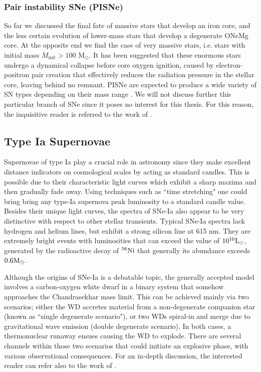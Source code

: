 \documentclass[../../main/thesis_msc.tex]{subfiles}
\begin{document}
				\subsubsection{Pair instability SNe (PISNe)}
				
					So far we discussed the final fate of massive stars that develop an iron core, and the less certain evolution of lower-mass stars that develop a degenerate ONeMg core. At the opposite end we find the case of very massive stars, i.e. stars with initial mass $M_{\text{init}} > 100$ M$_{\odot}$. It has been suggested \citep{langer12} that these enormous stars undergo a dynamical collapse before core oxygen ignition, caused by electron-positron pair creation that effectively reduces the radiation pressure in the stellar core, leaving behind no remnant. PISNe are expected to produce a wide variety of SN types depending on their mass range \citep{Gilmer2017}. We will not discuss further this particular branch of SNe since it poses no interest for this thesis. For this reason, the inquisitive reader is referred to the work of \cite{Langer_PISNe, Woosley_PISNe, Kozyreva2017, Gilmer2017}.
					
			
			\subsection{Type Ia Supernovae}
				
				Supernovae of type Ia play a crucial role in astronomy since they make excellent distance indicators on cosmological scales by acting as standard candles. This is possible due to their characteristic light curves which exhibit a sharp maxima and then gradually fade away. Using techniques such as ``time stretching" \citep{Perlmutter2003} one could bring bring any type-Ia supernova peak luminosity to a standard candle value. Besides their unique light curves, the spectra of SNe-Ia also appear to be very distinctive with respect to other stellar transients. Typical SNe-Ia spectra lack hydrogen and helium lines, but exhibit a strong silicon line at 615 nm. They are extremely bright events with luminosities that can exceed the value of $\rm 10^{10} L_{\odot}$, generated by the radioactive decay of $\rm ^{56}Ni$ that generally its abundance exceeds $\rm 0.6 M_{\odot}$.
				
				Although the origins of SNe-Ia is a debatable topic, the generally accepted model involves a carbon-oxygen white dwarf in a binary system that somehow approaches the Chandrasekhar mass limit. This can be achieved mainly via two scenarios; either the WD accretes material from a non-degenerate companion star (known as ``single degenerate scenario"), or two WDs spiral-in and merge due to gravitational wave emission (double degenerate scenario). In both cases, a thermonuclear runaway ensues causing the WD to explode. There are several channels within those two scenarios that could initiate an explosive phase, with various observational consequences. For an in-depth discussion, the interested reader can refer also to the work of \cite{Hillebrandt2000, Wang2018, SNe_book}.
				
\end{document}
